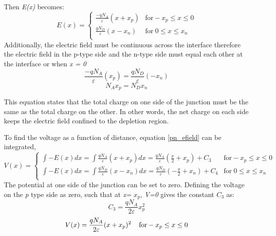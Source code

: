 \begin{doublespace}
Then \textit{E(x)} becomes:
\begin{equation}
E(x) = \begin{cases}
         \frac{-qN_{A}}{\varepsilon}(x+x_{p}) & \text{for}  -x_{p}\leq x \leq 0 \\
         \frac{qN_{D}}{\varepsilon}(x-x_{n})  &  \text{for} \; 0 \leq x \leq x_{n}  \\
     \end{cases}
\end{equation}
Additionally, the electric field must be continuous across the interface therefore the electric field in the p-type side and the n-type side must equal each other at the interface or when \textit{x = 0} 
\begin{equation}
\frac{-qN_{A}}{\varepsilon}(x_{p})=\frac{qN_{D}}{\varepsilon}(-x_{n}) \nonumber
\end{equation}
\begin{equation}
N_{A}x_{p}=N_{D}x_{n}
\label{NAeqND}
\end{equation}

This equation states that the total charge on one side of the junction must be the same as the total charge on the other. In other words, the net charge on each side keeps the electric field confined to the depletion region.

To find the voltage as a function of distance, equation \ref{pn_efield} can be integrated,
\begin{equation}
V(x) = \begin{cases}
       \int -E(x)dx=\int \frac{qN_{A}}{\varepsilon}(x+x_{p}) dx = \frac{qN_{A}}{\varepsilon}(\frac{x}{2}+x_{p})+ C_{3} & \text{for}  -x_{p}\leq x \leq 0 \\
       \int -E(x)dx=\int \frac{qN_{D}}{\varepsilon}(x-x_{n}) dx = \frac{qN_{D}}{\varepsilon}(-\frac{x}{2}+x_{n})+ C_{4}  &  \text{for} \; 0 \leq x \leq x_{n}  \\
     \end{cases}
\end{equation}
The potential at one side of the junction can be set to zero. Defining the voltage on the \textit{p} type side as zero, such that at \textit{x=} $x_p$, \textit{V=0} gives the constant $C_3$ as:
\begin{equation}
C_{3}=\frac{qN_{A}}{2\varepsilon}x_{p}^{2}
\end{equation}
\begin{equation}
V(x)=\frac{qN_{A}}{2\varepsilon}(x+x_{p})^{2}  \; \; \;\;  \text{for}  -x_{p}\leq x \leq 0 \\
\end{equation}


\end{doublespace}
